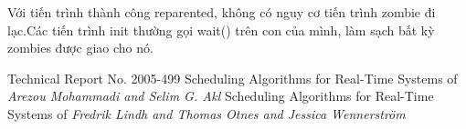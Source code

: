 \documentclass[a4paper,10pt]{report}
\begin{document}
Với tiến trình thành công reparented, không có nguy cơ tiến trình zombie đi lạc.Các tiến trình init thường gọi wait() trên con của mình, làm sạch bất kỳ zombies được giao cho nó.
\begin{thebibliography}{5} 
\bibitem{}Technical Report No. 2005-499 Scheduling Algorithms for Real-Time Systems of \textit{Arezou Mohammadi and Selim G. Akl}
\bibitem{}Scheduling Algorithms for Real-Time Systems of \textit{Fredrik Lindh and Thomas Otnes and Jessica Wennerström}
\bibitem{}
\end{thebibliography}
\end{document}
